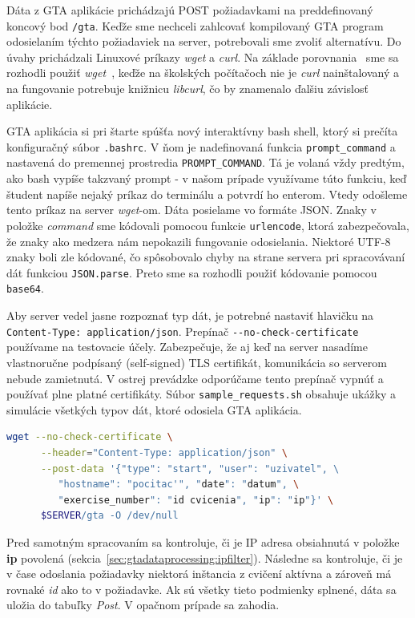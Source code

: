 Dáta z GTA aplikácie prichádzajú POST požiadavkami na preddefinovaný
koncový bod \verb'/gta'.
Keďže sme nechceli zahlcovať kompilovaný GTA program odosielaním
týchto požiadaviek na server, potrebovali sme zvoliť alternatívu. Do úvahy prichádzali
Linuxové príkazy \textit{wget} a \textit{curl}. Na základe
porovnania~\cite{bib:curlwget} sme sa rozhodli použiť
\textit{wget}~\cite{bib:wgetmanual},
keďže na školských počítačoch nie je \textit{curl} nainštalovaný a na fungovanie
potrebuje knižnicu \textit{libcurl}, čo by znamenalo ďalšiu závislosť aplikácie.

GTA aplikácia si pri štarte spúšťa nový interaktívny bash shell, ktorý si prečíta
konfiguračný súbor \verb'.bashrc'. V ňom je nadefinovaná funkcia \verb'prompt_command'
a nastavená do premennej prostredia \verb'PROMPT_COMMAND'. Tá je volaná vždy predtým,
ako bash vypíše takzvaný prompt - v našom prípade využívame túto funkciu, keď študent
napíše nejaký príkaz do terminálu a potvrdí ho enterom. Vtedy odošleme tento príkaz na
server \textit{wget}-om.
Dáta posielame vo formáte JSON. Znaky v položke \textit{command} sme kódovali
pomocou funkcie \verb'urlencode', ktorá zabezpečovala, že znaky ako medzera nám
nepokazili fungovanie odosielania. Niektoré UTF-8 znaky boli zle kódované, čo
spôsobovalo chyby na strane servera pri spracovávaní dát funkciou \verb'JSON.parse'.
Preto sme sa rozhodli použiť kódovanie pomocou \verb'base64'.

Aby server vedel jasne rozpoznať typ dát,
je potrebné nastaviť hlavičku na \\ \texttt{Content-Type: application/json}.
Prepínač \verb'--no-check-certificate' používame na testovacie účely.
Zabezpečuje, že aj keď na server nasadíme vlastnoručne podpísaný (self-signed)
TLS certifikát, komunikácia so serverom nebude zamietnutá. V ostrej prevádzke
odporúčame tento prepínač vypnúť a používať plne platné certifikáty.
Súbor \texttt{sample\_requests.sh} obsahuje ukážky a simulácie všetkých typov dát,
ktoré odosiela GTA aplikácia.

\begin{lstlisting}[language=Bash]
 wget --no-check-certificate \
      --header="Content-Type: application/json" \
      --post-data '{"type": "start", "user": "uzivatel", \
         "hostname": "pocitac'", "date": "datum", \
         "exercise_number": "id cvicenia", "ip": "ip"}' \
      $SERVER/gta -O /dev/null
\end{lstlisting}

Pred samotným spracovaním sa kontroluje, či je IP adresa
obsiahnutá v položke \textbf{ip} povolená (sekcia~\ref{sec:gtadataprocessing:ipfilter}).
Následne sa kontroluje, či je v čase odoslania požiadavky niektorá inštancia z
cvičení aktívna
a zároveň má rovnaké \textit{id} ako to v požiadavke. Ak sú všetky tieto podmienky
 splnené, dáta sa uložia do tabuľky \textit{Post}. V opačnom prípade sa zahodia.

